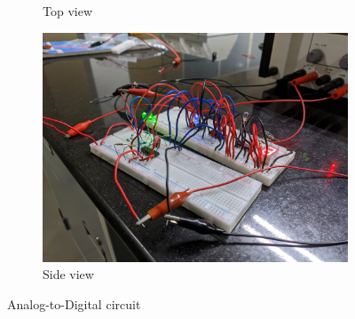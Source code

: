 \documentclass[%
 reprint,
nofootinbib,
 amsmath,amssymb,
 aps,
floatfix,
]{revtex4-2}
\begin{document}
\begin{figure}
\begin{subfigure}[b]{0.3\textwidth}
            \caption{Top view}
            \label{fig:y equals x}
        \end{subfigure}
        \hfill
        \begin{subfigure}[b]{0.3\textwidth}
            \centering
            \includegraphics[width=\textwidth]{Figures/4.jpg}
            \caption{Side view}
            \label{fig:three sin x}
        \end{subfigure}
        \caption{Analog-to-Digital circuit}
    \end{figure}
\end{document}
